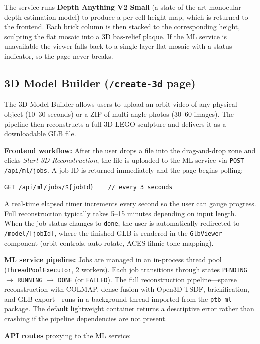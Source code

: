 \documentclass[12pt]{article}
\begin{document}
The service runs \textbf{Depth Anything V2 Small} (a state-of-the-art
monocular depth estimation model) to produce a per-cell height map, which is
returned to the frontend. Each brick column is then stacked to the
corresponding height, sculpting the flat mosaic into a 3D bas-relief plaque.
If the ML service is unavailable the viewer falls back to a single-layer flat
mosaic with a status indicator, so the page never breaks.

\subsection{3D Model Builder (\texttt{/create-3d} page)}

The 3D Model Builder allows users to upload an orbit video of any physical
object (10--30 seconds) or a ZIP of multi-angle photos (30--60 images). The
pipeline then reconstructs a full 3D LEGO sculpture and delivers it as a
downloadable GLB file.

\textbf{Frontend workflow:} After the user drops a file into the drag-and-drop
zone and clicks \textit{Start 3D Reconstruction}, the file is uploaded to the
ML service via \texttt{POST /api/ml/jobs}. A job ID is returned immediately and
the page begins polling:

\begin{verbatim}
GET /api/ml/jobs/${jobId}    // every 3 seconds
\end{verbatim}

A real-time elapsed timer increments every second so the user can gauge
progress. Full reconstruction typically takes 5--15 minutes depending on input
length. When the job status changes to \texttt{done}, the user is automatically
redirected to \texttt{/model/[jobId]}, where the finished GLB is rendered in
the \texttt{GlbViewer} component (orbit controls, auto-rotate, ACES filmic
tone-mapping).

\textbf{ML service pipeline:} Jobs are managed in an in-process thread pool
(\texttt{ThreadPoolExecutor}, 2 workers). Each job transitions through states
\texttt{PENDING} $\to$ \texttt{RUNNING} $\to$ \texttt{DONE} (or
\texttt{FAILED}). The full reconstruction pipeline---sparse reconstruction with
COLMAP, dense fusion with Open3D TSDF, brickification, and GLB export---runs in
a background thread imported from the \texttt{ptb\_ml} package. The default
lightweight container returns a descriptive error rather than crashing if the
pipeline dependencies are not present.

\textbf{API routes} proxying to the ML service:
\end{document}
